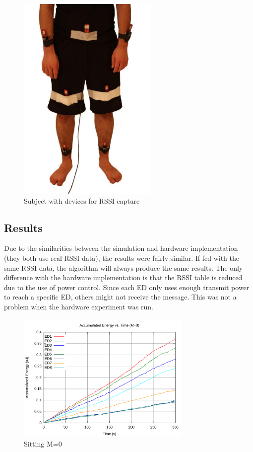 \documentclass{article}
\begin{document}
\begin{figure}[!htb]
\begin{center}
\includegraphics[width=0.6\textwidth]{figures/halfbody.pdf}
\end{center}
\caption{Subject with devices for RSSI capture}
\label{fig:halfbody}
\end{figure}


\subsection{Results}

Due to the similarities between the simulation and hardware implementation (they both use real RSSI data), the results were fairly similar. If fed with the same RSSI data, the algorithm will always produce the same results. The only difference with the hardware implementation is that the RSSI table is reduced due to the use of power control. Since each ED only uses enough transmit power to reach a specific ED, others might not receive the message. This was not a problem when the hardware experiment was run.

\begin{figure}[!htb]
\begin{center}
\includegraphics[width=0.75\textwidth]{figures/sit1-c0.pdf}
\caption{Sitting M=0}
\label{fig:sit1-c0}
\end{center}
\end{figure}
\end{document}

